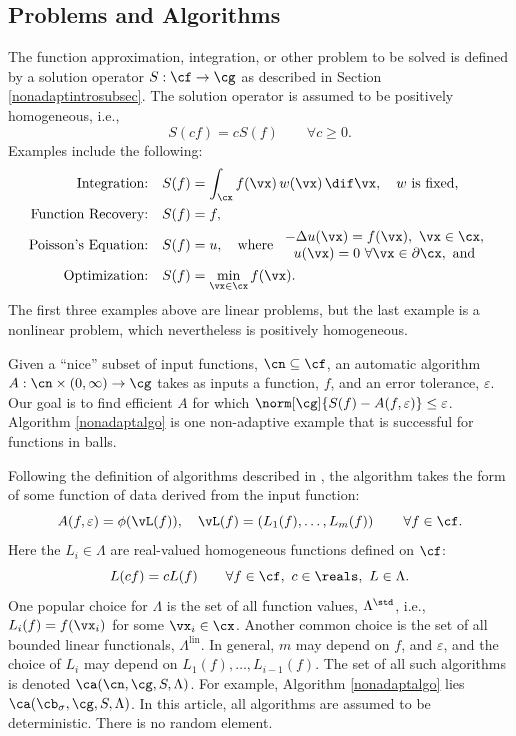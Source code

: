\documentclass[]{elsarticle}
\DeclareMathOperator{\lin}{lin}
\theoremstyle{definition}
\theoremstyle{remark}
\begin{document}
\subsection{Problems and Algorithms} The function approximation, integration, or other problem to be solved is defined by a solution operator $S:\cf \to \cg$ as described in Section \ref{nonadaptintrosubsec}. The solution operator is assumed to be positively homogeneous, i.e., 
\[
S(cf) = cS(f) \qquad \forall c\ge 0.
\]
Examples include the following:
\begin{align*}
\text{Integration:} \quad & S(f) = \int_{\cx} f(\vx) \, w(\vx) \, \dif \vx, \quad w \text{ is fixed,}\\
\text{Function Recovery:} \quad & S(f) = f, \\
\text{Poisson's Equation:} \quad & S(f) = u, \quad \text{where } \begin{array}{c} -\Delta u(\vx) = f(\vx), \ \vx \in \cx, \\ u(\vx)=0 \ \forall \vx \in \partial \cx, \text{ and}\end{array} \\
\text{Optimization:} \quad & S(f) = \min_{\vx \in \cx} f(\vx).
\end{align*}
The first three examples above are linear problems, but the last example is a nonlinear problem, which nevertheless is positively homogeneous.

Given a ``nice'' subset of input functions, $\cn \subseteq \cf$, an automatic algorithm $A:\cn\times(0,\infty) \to \cg$ takes as inputs a function, $f$, and an error tolerance, $\varepsilon$.  Our goal is to find efficient $A$ for which $\norm[\cg]{S(f)-A(f,\varepsilon)}\le \varepsilon$.  Algorithm \ref{nonadaptalgo} is one non-adaptive example that is successful for functions in balls.

Following the definition of algorithms described in \cite[Section 3.2]{TraWasWoz88}, the algorithm takes the form of some function of data derived from the input function:
\begin{equation*}
\label{algoform}
A(f,\varepsilon) =  \phi(\vL(f)), \quad \vL(f) = \left(L_1(f), \ldots, L_m(f)\right) \qquad \forall f \in \cf.
\end{equation*}
Here the $L_i \in \Lambda$ are real-valued homogeneous functions defined on $\cf$:
\begin{equation*}
\label{dataassump}
L(cf) = cL(f) \qquad \forall f \in \cf, \ c \in \reals, \ L \in \Lambda.
\end{equation*}
One popular choice for $\Lambda$ is the set of all function values, $\Lambda^{\std}$, i.e., $L_i(f) = f(\vx_i)$ for some $\vx_i \in \cx$.  Another common choice is the set of all bounded linear functionals, $\Lambda^{\lin}$.  In general, $m$ may depend on $f$, and $\varepsilon$, and the choice of $L_i$ may depend on $L_1(f), \ldots, L_{i-1}(f)$.  The set of all such algorithms is denoted $\ca(\cn,\cg,S,\Lambda)$. For example, Algorithm \ref{nonadaptalgo} lies $\ca(\cb_{\sigma},\cg,S,\Lambda)$.  In this article, all algorithms are assumed to be deterministic.  There is no random element.
\end{document}
